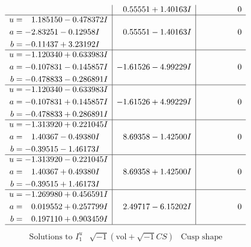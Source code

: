 \documentclass[1p]{elsarticle_modified}
\theoremstyle{definition}
\newcommand{\I}{\sqrt{-1}}
\begin{document}
$$\begin{array}{c|c|c}
 & \phantom{-}0.55551 + 1.40163 I & \phantom{-0.000000 } 0 \\ \hline\begin{aligned}
u &= \phantom{-}1.185150 - 0.478372 I \\
a &= -2.83251 - 0.12958 I \\
b &= -0.11437 + 3.23192 I\end{aligned}
 & \phantom{-}0.55551 - 1.40163 I & \phantom{-0.000000 } 0 \\ \hline\begin{aligned}
u &= -1.120340 + 0.633983 I \\
a &= -0.107831 - 0.145857 I \\
b &= -0.478833 - 0.286891 I\end{aligned}
 & -1.61526 - 4.99229 I & \phantom{-0.000000 } 0 \\ \hline\begin{aligned}
u &= -1.120340 - 0.633983 I \\
a &= -0.107831 + 0.145857 I \\
b &= -0.478833 + 0.286891 I\end{aligned}
 & -1.61526 + 4.99229 I & \phantom{-0.000000 } 0 \\ \hline\begin{aligned}
u &= -1.313920 + 0.221045 I \\
a &= \phantom{-}1.40367 - 0.49380 I \\
b &= -0.39515 - 1.46173 I\end{aligned}
 & \phantom{-}8.69358 - 1.42500 I & \phantom{-0.000000 } 0 \\ \hline\begin{aligned}
u &= -1.313920 - 0.221045 I \\
a &= \phantom{-}1.40367 + 0.49380 I \\
b &= -0.39515 + 1.46173 I\end{aligned}
 & \phantom{-}8.69358 + 1.42500 I & \phantom{-0.000000 } 0 \\ \hline\begin{aligned}
u &= -1.269980 + 0.456591 I \\
a &= \phantom{-}0.019552 + 0.257799 I \\
b &= \phantom{-}0.197110 + 0.903459 I\end{aligned}
 & \phantom{-}2.49717 - 6.15202 I & \phantom{-0.000000 } 0\\
 \hline 
 \end{array}$$\newpage$$\begin{array}{c|c|c}  
\text{Solutions to }I^u_{1}& \I (\text{vol} + \sqrt{-1}CS) & \text{Cusp shape}\\

\end{array}$$
\end{document}
